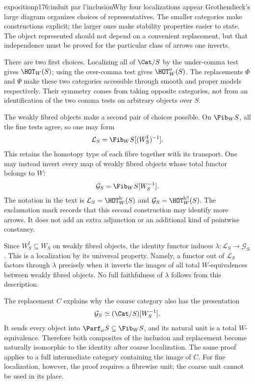 \begin{dcomment}{exposition}{p176:induit par l'inclusion}{Why four localizations appear}
Grothendieck's large diagram organizes choices of representatives. The smaller categories make constructions explicit; the larger ones make stability properties easier to state. The object represented should not depend on a convenient replacement, but that independence must be proved for the particular class of arrows one inverts.

There are two first choices. Localizing all of $\Cat/S$ by the under-comma test gives $\HOT_W(S)$; using the over-comma test gives $\HOT_W^o(S)$. The replacements $\Phi$ and $\Psi$ make these two categories accessible through smooth and proper models respectively. Their symmetry comes from taking opposite categories, not from an identification of the two comma tests on arbitrary objects over $S$.

The weakly fibred objects make a second pair of choices possible. On $\Fib_W S$, all the fine tests agree, so one may form
\[
 \mathcal L_S=\Fib_W S[(W_S^{\mathrm f})^{-1}].
\]
This retains the homotopy type of each fibre together with its transport. One may instead invert every map of weakly fibred objects whose total functor belongs to $W$:
\[
 \mathcal G_S=\Fib_W S[W_S^{-1}].
\]
The notation in the text is $\mathcal L_S=\HOT_W^{\mathrm{lc}}(S)$ and $\mathcal G_S=\HOT_W^{\mathrm{lc}!}(S)$. The exclamation mark records that this second construction may identify more arrows. It does not add an extra adjunction or an additional kind of pointwise constancy.

Since $W_S^{\mathrm f}\subseteq W_S$ on weakly fibred objects, the identity functor induces $\lambda:\mathcal L_S\to\mathcal G_S$. This is a localization by its universal property. Namely, a functor out of $\mathcal L_S$ factors through $\lambda$ precisely when it inverts the images of all total $W$-equivalences between weakly fibred objects. No full faithfulness of $\lambda$ follows from this description.

The replacement $C$ explains why the coarse category also has the presentation
\[
 \mathcal G_S\simeq(\Cat/S)[W_S^{-1}].
\]
It sends every object into $\Parf_\omega S\subseteq\Fib_W S$, and its natural unit is a total $W$-equivalence. Therefore both composites of the inclusion and replacement become naturally isomorphic to the identity after coarse localization. The same proof applies to a full intermediate category containing the image of $C$. For fine localization, however, the proof requires a fibrewise unit; the coarse unit cannot be used in its place.


\end{dcomment}
